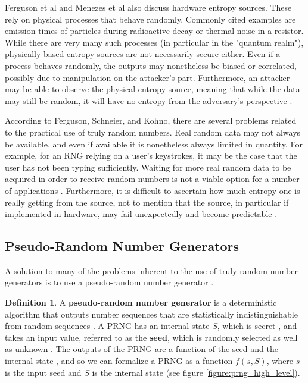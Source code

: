\documentclass[12pt, titlepage]{report}
\theoremstyle{definition}
\newtheorem{definition}{Definition}
\begin{document}
Ferguson et al and Menezes et al also discuss hardware entropy sources. These rely on physical processes that behave randomly. Commonly cited examples are emission times of particles during radioactive decay or thermal noise in a resistor. While there are very many such processes (in particular in the "quantum realm"), physically based entropy sources are not necessarily secure either. Even if a process behaves randomly, the outputs may nonetheless be biased or correlated, possibly due to manipulation on the attacker's part. Furthermore, an attacker may be able to observe the physical entropy source, meaning that while the data may still be random, it will have no entropy from the adversary's perspective \cite[p. 138-139]{ferguson2010cryptography} \cite[p. 172]{menezes1996handbook}.

According to Ferguson, Schneier, and Kohno, there are several problems related to the practical use of truly random numbers. Real random data may not always be available, and even if available it is nonetheless always limited in quantity. For example, for an RNG relying on a user's keystrokes, it may be the case that the user has not been typing sufficiently. Waiting for more real random data to be acquired in order to receive random numbers is not a viable option for a number of applications \cite[p. 139]{ferguson2010cryptography}. Furthermore, it is difficult to ascertain how much entropy one is really getting from the source, not to mention that the source, in particular if implemented in hardware, may fail unexpectedly and become predictable \cite{ferguson2010cryptography}.



\subsection{Pseudo-Random Number Generators}\label{subsection:prngs}
A solution to many of the problems inherent to the use of truly random number generators is to use a pseudo-random number generator \cite[p. 140]{ferguson2010cryptography}.

\begin{definition}
 A \textbf{pseudo-random number generator} is a deterministic algorithm that outputs number sequences that are statistically indistinguishable from random sequences \cite{menezes1996handbook}. A PRNG has an internal state $S$, which is secret \cite{kelsey1998cryptanalytic}, and takes an input value, referred to as the \textbf{seed}, which is randomly selected as well as unknown \cite[s. 1.1.4]{rukhin2001statistical}. The outputs of the PRNG are a function of the seed and the internal state \cite{kelsey1998cryptanalytic} \cite[s 1.1.4]{rukhin2001statistical}, and so we can formalize a PRNG as a function $f(s, S)$, where $s$ is the input seed and $S$ is the internal state (see figure \ref{figure:prng_high_level}).
\end{definition}
\end{document}
